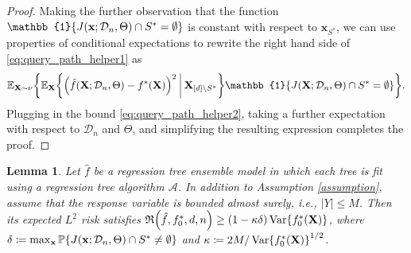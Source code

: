 \documentclass[11pt]{article}
\newtheorem{lemma}[theorem]{Lemma}
\newcommand{\bx}{\mathbf{x}}
\newcommand{\bX}{\mathbf{X}}
\DeclarePairedDelimiter{\braces}{\lbrace}{\rbrace}
\DeclarePairedDelimiter{\paren}{(}{)}
\renewcommand{\P}{\mathbb{P}}
\newcommand{\E}{\mathbb{E}}
\newcommand{\indicator}{\mathbb{1}}
\newcommand{\Var}{\operatorname{Var}}
\newcommand{\xmeasure}{\nu}
\newcommand{\nfeats}{d}
\newcommand{\nsamples}{n}
\newcommand{\coordindices}{[\nfeats]}
\newcommand{\data}[1][n]{\mathcal{D}_{#1}}
\newcommand{\suppset}{S^*}
\newcommand{\fna}{\hat{f}_{\operatorname{NA}}}
\newcommand{\alg}{\mathcal{A}}
\newcommand{\objective}{\mathfrak{R}}
\newcommand{\ybound}{M}
\begin{document}
\begin{proof}
    Making the further observation that the function $\indicator\braces*{J(\bx;\data,\Theta)\cap \suppset = \emptyset }$ is constant with respect to $\bx_{\suppset}$, 
    we can use properties of conditional expectations to rewrite the right hand side of \eqref{eq:query_path_helper1} as
    \begin{equation}
        \E_{\bX\sim\xmeasure}\braces*{\E_{\bX}\braces*{\paren*{\hat f(\bX;\data,\Theta) - f^*(\bX)}^2~
            \vline~\bX_{\coordindices\backslash\suppset}}\indicator\braces*{J(\bX;\data,\Theta)\cap \suppset = \emptyset }}.
    \end{equation}
    Plugging in the bound \eqref{eq:query_path_helper2}, taking a further expectation with respect to $\data$ and $\Theta$, and simplifying the resulting expression completes the proof.
\end{proof}

\begin{lemma}
\label{lem:covariate_selection_ensemble}
    Let $\hat f$ be a regression tree ensemble model in which each tree is fit using a regression tree algorithm $\alg$.
    In addition to Assumption \ref{assumption}, assume that the response variable is bounded almost surely, i.e., $|Y| \leq \ybound$. 
    Then its expected $L^2$ risk satisfies $\objective\paren*{\hat f, f^*_0,\nfeats,\nsamples} \geq (1-\kappa\delta)\Var\braces*{f^*_0(\bX)}$, where $\delta \coloneqq \max_{\bx}\P\braces*{J(\bx;\data,\Theta)\cap \suppset \neq \emptyset }$ and $\kappa \coloneqq 2\ybound/\Var\braces*{f^*_0(\bX)}^{1/2}$.
\end{lemma}
\end{document}
